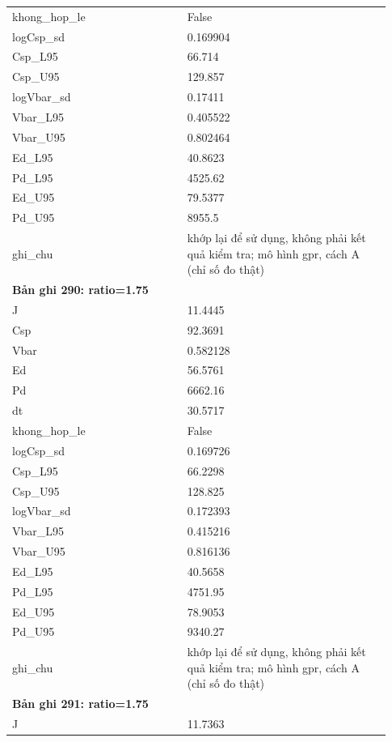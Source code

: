 \begin{longtable}{p{0.43\linewidth}p{0.50\linewidth}}
khong\_\allowbreak hop\_\allowbreak le & False \\
logCsp\_\allowbreak sd & 0.169904 \\
Csp\_\allowbreak L95 & 66.714 \\
Csp\_\allowbreak U95 & 129.857 \\
logVbar\_\allowbreak sd & 0.17411 \\
Vbar\_\allowbreak L95 & 0.405522 \\
Vbar\_\allowbreak U95 & 0.802464 \\
Ed\_\allowbreak L95 & 40.8623 \\
Pd\_\allowbreak L95 & 4525.62 \\
Ed\_\allowbreak U95 & 79.5377 \\
Pd\_\allowbreak U95 & 8955.5 \\
ghi\_\allowbreak chu & khớp lại để sử dụng, không phải kết quả kiểm tra; mô hình gpr, cách A (chỉ số đo thật) \\
\midrule
\multicolumn{2}{p{0.95\linewidth}}{\textbf{Bản ghi 290: ratio=1.75}} \\
J & 11.4445 \\
Csp & 92.3691 \\
Vbar & 0.582128 \\
Ed & 56.5761 \\
Pd & 6662.16 \\
dt & 30.5717 \\
khong\_\allowbreak hop\_\allowbreak le & False \\
logCsp\_\allowbreak sd & 0.169726 \\
Csp\_\allowbreak L95 & 66.2298 \\
Csp\_\allowbreak U95 & 128.825 \\
logVbar\_\allowbreak sd & 0.172393 \\
Vbar\_\allowbreak L95 & 0.415216 \\
Vbar\_\allowbreak U95 & 0.816136 \\
Ed\_\allowbreak L95 & 40.5658 \\
Pd\_\allowbreak L95 & 4751.95 \\
Ed\_\allowbreak U95 & 78.9053 \\
Pd\_\allowbreak U95 & 9340.27 \\
ghi\_\allowbreak chu & khớp lại để sử dụng, không phải kết quả kiểm tra; mô hình gpr, cách A (chỉ số đo thật) \\
\midrule
\multicolumn{2}{p{0.95\linewidth}}{\textbf{Bản ghi 291: ratio=1.75}} \\
J & 11.7363 \\

\end{longtable}
